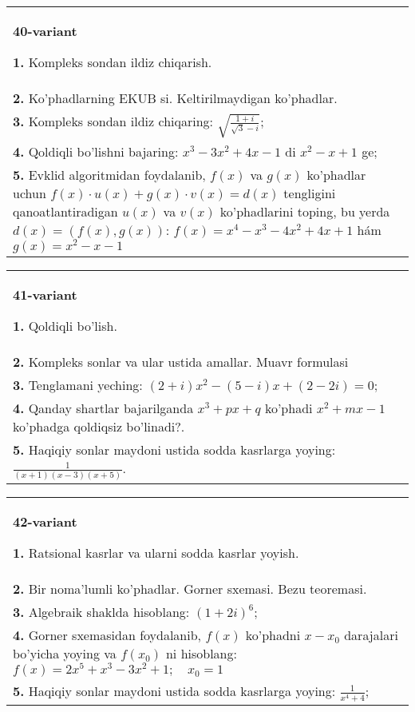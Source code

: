 \documentclass{article}
\begin{document}
\begin{tabular}{m{17cm}}
\textbf{40-variant}
\newline

\textbf{1.} Kompleks sondan ildiz chiqarish. \\
\textbf{2.} Ko’phadlarning EKUB si. Keltirilmaydigan ko’phadlar. \\
\textbf{3.} Kompleks sondan ildiz chiqaring: $\sqrt{\frac{1+i}{\sqrt{3}-i}}$; \\
\textbf{4.} Qoldiqli bo’lishni bajaring:  $x^3-3 x^2+4 x-1$ di $x^2-x+1$ ge; \\
\textbf{5.} Evklid algoritmidan foydalanib, $f(x)$ va $g(x)$ ko’phadlar uchun $f(x) \cdot u(x)+g(x) \cdot v(x)=d(x)$ tengligini qanoatlantiradigan $u(x)$ va $v(x)$ ko’phadlarini toping, bu yerda $d(x)=(f(x), g(x))$:  $f(x)=x^4-x^3-4 x^2+4 x+1$ hám $g(x)=x^2-x-1$ \\

\end{tabular}
\vspace{1cm}


\begin{tabular}{m{17cm}}
\textbf{41-variant}
\newline

\textbf{1.} Qoldiqli bo’lish.  \\
\textbf{2.} Kompleks sonlar va ular ustida amallar. Muavr formulasi  \\
\textbf{3.} Tenglamani yeching:  $(2+i) x^2-(5-i) x+(2-2 i)=0$; \\
\textbf{4.} Qanday shartlar bajarilganda $x^3+p x+q$ ko’phadi $x^2+m x-1$ ko’phadga qoldiqsiz bo’linadi?. \\
\textbf{5.} Haqiqiy sonlar maydoni ustida sodda kasrlarga yoying:  $\frac{1}{(x+1)(x-3)(x+5)}$. \\

\end{tabular}
\vspace{1cm}


\begin{tabular}{m{17cm}}
\textbf{42-variant}
\newline

\textbf{1.} Ratsional kasrlar va ularni sodda kasrlar yoyish. \\
\textbf{2.} Bir noma’lumli ko’phadlar. Gorner sxemasi. Bezu teoremasi.  \\
\textbf{3.} Algebraik shaklda hisoblang: $(1+2 i)^6$; \\
\textbf{4.} Gorner sxemasidan foydalanib, $f(x)$ ko’phadni $x-x_0$ darajalari bo’yicha yoying va $f\left(x_0\right)$ ni hisoblang:  $f(x)=2 x^5+x^3-3 x^2+1 ; \quad x_0=1$ \\
\textbf{5.} Haqiqiy sonlar maydoni ustida sodda kasrlarga yoying:  $\frac{1}{x^4+4}$; \\

\end{tabular}
\vspace{1cm}
\end{document}
